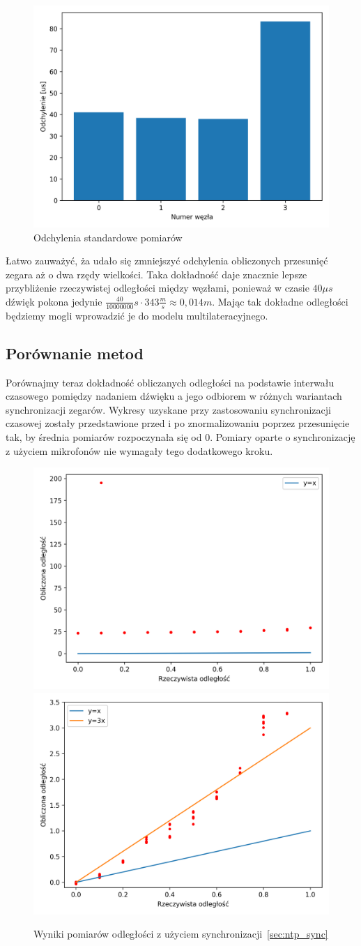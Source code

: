 \begin{figure}[H]
\centering
    \includegraphics[width=.49\textwidth]{pics/mic_sync/stddev_offsets.png}
\caption{Odchylenia standardowe pomiarów}
\label{pic:stddev_mic}
\end{figure}

Łatwo zauważyć, ża udało się zmniejszyć odchylenia obliczonych przesunięć zegara aż o dwa rzędy wielkości. Taka dokładność daje znacznie lepsze przybliżenie rzeczywistej odległości między węzłami, ponieważ w czasie $40 \mu s$ dźwięk pokona jedynie $\frac{40}{10000000}s \cdot 343 \frac{m}{s} \approx 0,014m$. Mając tak dokładne odległości będziemy mogli wprowadzić je do modelu multilateracyjnego.

\subsection{Porównanie metod}

Porównajmy teraz dokładność obliczanych odległości na podstawie interwału czasowego pomiędzy nadaniem dźwięku a jego odbiorem w różnych wariantach synchronizacji zegarów. Wykresy uzyskane przy zastosowaniu synchronizacji czasowej zostały przedstawione przed i po znormalizowaniu poprzez przesunięcie tak, by średnia pomiarów rozpoczynała się od 0. Pomiary oparte o synchronizację z użyciem mikrofonów nie wymagały tego dodatkowego kroku.

\begin{figure}[H]
\centering
    \includegraphics[width=.49\textwidth]{pics/ntp_sync_dist/dists.png}
    \includegraphics[width=.49\textwidth]{pics/ntp_sync_dist/dists_close.png}
\caption{Wyniki pomiarów odległości z użyciem synchronizacji~\ref{sec:ntp_sync}}
\label{pic:ntp_sync_dist}
\end{figure}

